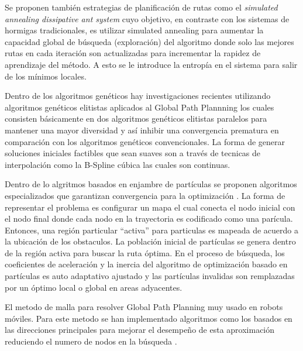 Se proponen tambi\'en estrategias de planificaci\'on de rutas como el \textit{simulated annealing dissipative ant system}  \cite{Wang08} cuyo objetivo, en contraste con los sistemas de hormigas tradicionales, es utilizar simulated annealing para aumentar la capacidad global de b\'usqueda (exploraci\'on) del algoritmo donde solo las mejores rutas en cada iteraci\'on son actualizadas para incrementar la rapidez de aprendizaje del m\'etodo. A esto se le introduce la entrop\'ia en el sistema para salir de los m\'inimos locales. 

Dentro de los algoritmos gen\'eticos hay investigaciones recientes utilizando algoritmos gen\'eticos elitistas aplicados al Global Path Plannning \cite{Tsai} los cuales consisten b\'asicamente en dos algoritmos gen\'eticos elitistas paralelos  para mantener una mayor diversidad y as\'i inhibir una convergencia prematura en comparaci\'on con los algoritmos gen\'eticos convencionales. La forma de generar soluciones iniciales factibles que sean suaves son a trav\'es de tecnicas de interpolaci\'on como la B-Spline c\'ubica \cite{Tsai} las cuales son continuas.

Dentro de lo algritmos basados en enjambre de part\'iculas  se proponen algoritmos especializados que garantizan convergencia para la optimizaci\'on \cite{Zenyu10}. La forma de representar el problema es configurar un mapa el cual conecta el nodo inicial con el nodo final donde cada nodo en la trayectoria es codificado como una par\'icula.  Entonces, una regi\'on particular ``activa'' para particulas es mapeada de acuerdo a la ubicaci\'on de los obstaculos. La poblaci\'on inicial de part\'iculas se genera dentro de la regi\'on activa para buscar la ruta \'optima. En el proceso de b\'usqueda, los coeficientes de aceleraci\'on y la inercia del algoritmo de optimizaci\'on basado en part\'iculas  es auto adaptativo ajustado y las part\'iculas invalidas son remplazadas por un \'optimo local o global en areas adyacentes. 

El metodo de malla para resolver Global Path Planning muy usado en robots m\'oviles. Para este metodo se han implementado algoritmos como los basados en las direcciones principales para mejorar el desempe\~no de esta aproximaci\'on reduciendo el numero de nodos en la b\'usqueda \cite{Zhenyu101}.


